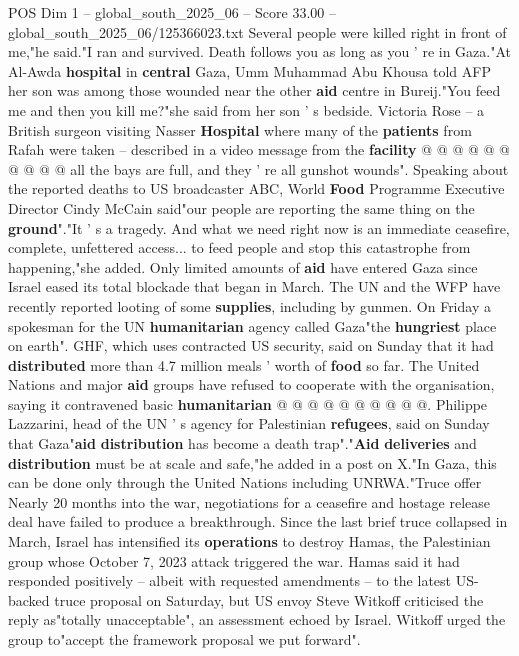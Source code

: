 \begin{textsample}{POS Dim 1 – global\_south\_2025\_06 – Score 33.00 – global\_south\_2025\_06/125366023.txt}
Several people were killed right in front of me,"he said."I ran and survived.
Death follows you as long as you ' re in Gaza."At Al-Awda \textbf{hospital} in \textbf{central} Gaza, Umm Muhammad Abu Khousa told AFP her son was among those wounded near the other \textbf{aid} centre in Bureij."You feed me and then you kill me?"she said from her son ' s bedside.
Victoria Rose -- a British surgeon visiting Nasser \textbf{Hospital} where many of the \textbf{patients} from Rafah were taken -- described in a video message from the \textbf{facility} @ @ @ @ @ @ @ @ @ @ all the bays are full, and they ' re all gunshot wounds".
Speaking about the reported deaths to US broadcaster ABC, World \textbf{Food} Programme Executive Director Cindy McCain said"our people are reporting the same thing on the \textbf{ground}"."It ' s a tragedy.
And what we need right now is an immediate ceasefire, complete, unfettered access... to feed people and stop this catastrophe from happening,"she added.
Only limited amounts of \textbf{aid} have entered Gaza since Israel eased its total blockade that began in March.
The UN and the WFP have recently reported looting of some \textbf{supplies}, including by gunmen.
On Friday a spokesman for the UN \textbf{humanitarian} agency called Gaza"the \textbf{hungriest} place on earth".
GHF, which uses contracted US security, said on Sunday that it had \textbf{distributed} more than 4.7 million meals ' worth of \textbf{food} so far.
The United Nations and major \textbf{aid} groups have refused to cooperate with the organisation, saying it contravened basic \textbf{humanitarian} @ @ @ @ @ @ @ @ @ @.
Philippe Lazzarini, head of the UN ' s agency for Palestinian \textbf{refugees}, said on Sunday that Gaza"\textbf{aid} \textbf{distribution} has become a death trap"."\textbf{Aid} \textbf{deliveries} and \textbf{distribution} must be at scale and safe,"he added in a post on X."In Gaza, this can be done only through the United Nations including UNRWA."Truce offer Nearly 20 months into the war, negotiations for a ceasefire and hostage release deal have failed to produce a breakthrough.
Since the last brief truce collapsed in March, Israel has intensified its \textbf{operations} to destroy Hamas, the Palestinian group whose October 7, 2023 attack triggered the war.
Hamas said it had responded positively -- albeit with requested amendments -- to the latest US-backed truce proposal on Saturday, but US envoy Steve Witkoff criticised the reply as"totally unacceptable", an assessment echoed by Israel.
Witkoff urged the group to"accept the framework proposal we put forward".

\end{textsample}
